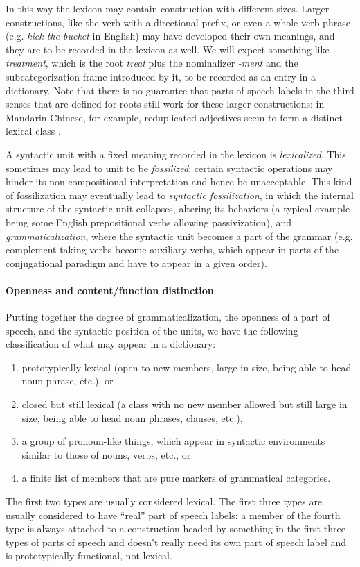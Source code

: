 \documentclass[a4paper, oneside, 12pt]{report}
\newcommand*{\citesec}[1]{\S~{#1}}
\newcommand*{\term}[1]{\emph{#1}}
\newcommand{\form}[1]{\emph{#1}}
\begin{document}
In this way the lexicon may contain construction with different sizes.
Larger constructions, like the verb with a directional prefix,
or even a whole verb phrase (e.g. \form{kick the bucket} in English)
may have developed their own meanings,
and they are to be recorded in the lexicon as well.
We will expect something like \form{treatment},
which is the root \form{treat} plus the nominalizer \term{-ment}
and the subcategorization frame introduced by it,
to be recorded as an entry in a dictionary.
Note that there is no guarantee that parts of speech labels in the third senses
that are defined for roots still work for these larger constructions:
in Mandarin Chinese, for example, reduplicated adjectives seem to form a distinct lexical class
\citep[\citesec{5.3}]{paul2014new}.

A syntactic unit with a fixed meaning recorded in the lexicon is \emph{lexicalized}.
This sometimes may lead to unit to be \emph{fossilized}:
certain syntactic operations may hinder its non-compositional interpretation 
and hence be unacceptable.
This kind of fossilization may eventually lead to \emph{syntactic fossilization},
in which the internal structure of the syntactic unit collapses,
altering its behaviors
(a typical example being some English prepositional verbs allowing passivization),
and \emph{grammaticalization},
where the syntactic unit becomes a part of the grammar 
(e.g. complement-taking verbs become auxiliary verbs,
which appear in parts of the conjugational paradigm and have to appear in a given order).

\paragraph*{Openness and content/function distinction}
Putting together the degree of grammaticalization,
the openness of a part of speech,
and the syntactic position of the units,
we have the following classification of what may appear in a dictionary:
\begin{enumerate}
    \item prototypically lexical 
    (open to new members, large in size, being able to head noun phrase, etc.), or
    \item closed but still lexical 
    (a class with no new member allowed but still large in size, being able to head noun phrases, clauses, etc.),
    \item a group of pronoun-like things, which appear in syntactic environments similar to those of nouns, verbs, etc., or
    \item a finite list of members that are pure markers of grammatical categories.
\end{enumerate}
The first two types are usually considered lexical.
The first three types are usually considered to have 
``real'' part of speech labels: 
a member of the fourth type is always attached to a construction headed by 
something in the first three types of parts of speech
and doesn't really need its own part of speech label and is prototypically functional, not lexical.
\end{document}
